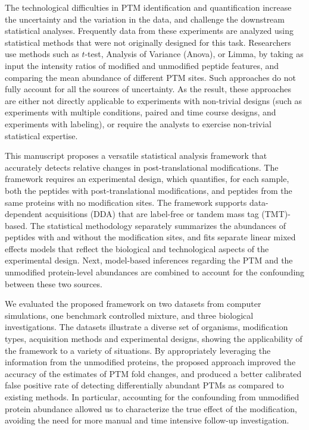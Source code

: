 \documentclass[mcp]{article}
\numberwithin{table}{section}
\begin{document}
The technological difficulties in PTM identification and quantification increase the uncertainty and the variation in the data, and challenge the downstream statistical analyses. Frequently data from these experiments are analyzed using statistical methods that were not originally designed for this task. Researchers use methods such as $t$-test\cite{Kalpic:2011}, Analysis of Variance (Anova)\cite{girden:1992}, or Limma\cite{Ritchie_15a}, by taking as input the intensity ratios of modified and unmodified peptide features, and comparing the mean abundance of different PTM sites. Such approaches do not fully account for all the sources of uncertainty. As the result, these approaches are either not directly applicable to experiments with non-trivial designs (such as experiments with multiple conditions, paired and time course designs, and experiments with labeling), or require the analysts to exercise non-trivial statistical expertise.

This manuscript proposes a versatile statistical analysis framework that accurately detects relative changes in post-translational modifications. The framework requires an experimental design, which quantifies, for each sample, both the peptides with post-translational modifications, and peptides from the same proteins with no modification sites. The framework supports data-dependent acquisitions (DDA) that are label-free or tandem mass tag (TMT)-based. The statistical methodology separately summarizes the abundances of peptides with and without the modification sites, and fits separate linear mixed effects models that reflect the biological and technological aspects of the experimental design. Next, model-based inferences regarding the PTM and the unmodified protein-level abundances are combined to account for the confounding between these two sources.

We evaluated the proposed framework on two datasets from computer simulations, one benchmark controlled mixture, and three biological investigations. The datasets illustrate a diverse set of organisms, modification types, acquisition methods and experimental designs, showing the applicability of the framework to a variety of situations. By appropriately leveraging the information from the unmodified proteins, the proposed approach improved the accuracy of the estimates of PTM fold changes, and produced a better calibrated false positive rate of detecting differentially abundant PTMs as compared to existing methods. In particular, accounting for the confounding from unmodified protein abundance allowed us to characterize the true effect of the modification, avoiding the need for more manual and time intensive follow-up investigation.
\end{document}
